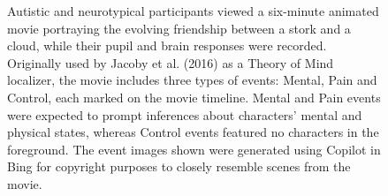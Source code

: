 \begin{figure}[!ht]
	\centering
	\caption{Autistic and neurotypical participants viewed a six-minute animated movie portraying the evolving friendship between a stork and a cloud, while their pupil and brain responses were recorded. Originally used by Jacoby et al. (2016) as a Theory of Mind localizer, the movie includes three types of events: Mental, Pain and Control, each marked on the movie timeline. Mental and Pain events were expected to prompt inferences about characters' mental and physical states, whereas Control events featured no characters in the foreground. The event images shown were generated using Copilot in Bing for copyright purposes to closely resemble scenes from the movie.}
    \vspace*{-10pt}
	\label{fig:task-fig}
\end{figure}


